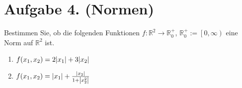 \documentclass[german,12pt]{homework}
\newcommand{\RR}{\mathbb{R}}
\DeclarePairedDelimiter{\absolute}{\lvert}{\rvert}
\DeclarePairedDelimiter{\enbrace}{(}{)}
\begin{document}
    \section*{Aufgabe 4. (Normen)}

    \begin{problem}
        Bestimmen Sie, ob die folgenden Funktionen \(f: \RR^2 \to \RR_0^+\), \(\RR_0^+ := \left[0, \infty\right)\) eine Norm auf \(\RR^2\) ist.
        \begin{enumerate}
            \item \(f\enbrace*{x_1, x_2} = 2\absolute*{x_1} + 3\absolute*{x_2}\)
            \item \(f\enbrace*{x_1, x_2} = \absolute*{x_1} + \frac{\absolute*{x_2}}{1 + \absolute*{x_2^2}}\)
        \end{enumerate}
    \end{problem}
\end{document}
